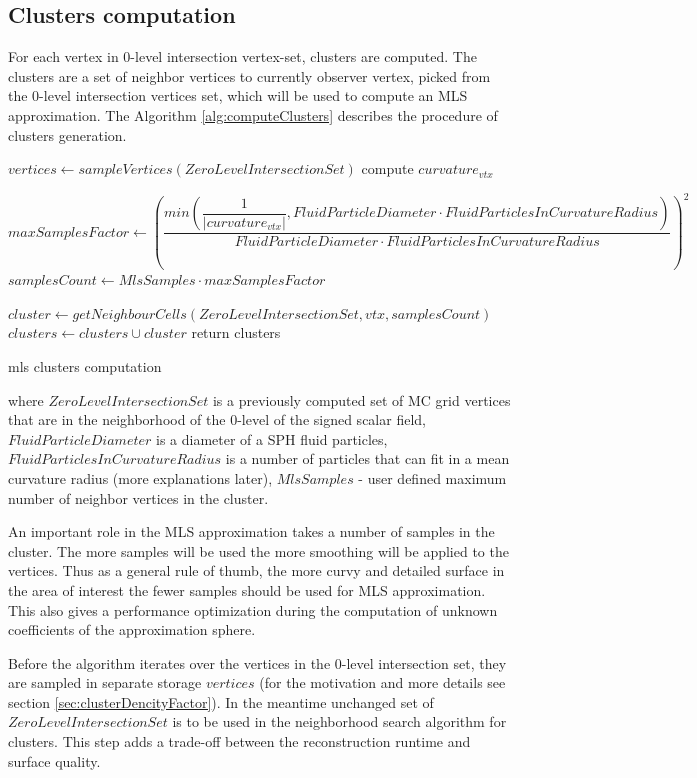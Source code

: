 \subsection{Clusters computation}
For each vertex in  0-level intersection vertex-set, clusters are computed. The clusters are a set of neighbor vertices to currently observer vertex, picked from the 0-level intersection vertices set, which will be used to compute an MLS approximation. The Algorithm \ref{alg:computeClusters} describes the procedure of clusters generation.
\begin{algorithm}[H]
	\scriptsize
	\begin{algorithmic}
			\State $vertices \gets sampleVertices(ZeroLevelIntersectionSet)$
				\State compute $curvature_{vtx}$

				\State $maxSamplesFactor \gets \left(\dfrac{min(\dfrac{1}{|curvature_{vtx}|}, FluidParticleDiameter \cdot FluidParticlesInCurvatureRadius)}{FluidParticleDiameter \cdot FluidParticlesInCurvatureRadius}\right)^2$
				\State $samplesCount \gets MlsSamples \cdot maxSamplesFactor$

				\State $cluster \gets getNeighbourCells(ZeroLevelIntersectionSet, vtx, samplesCount)$
				\State $clusters \gets clusters \cup cluster$ 
			\EndFor
			\State return clusters
	\end{algorithmic}
	\caption{mls clusters computation}
	\label{alg:computeClusters}
\end{algorithm}
where $ZeroLevelIntersectionSet$ is a previously computed set of MC grid vertices that are in the neighborhood of the 0-level of the signed scalar field, $FluidParticleDiameter$ is a diameter of a SPH fluid particles, $FluidParticlesInCurvatureRadius$ is a number of particles that can fit in a mean curvature radius (more explanations later), $MlsSamples$ - user defined maximum number of neighbor vertices in the cluster.

An important role in the MLS approximation takes a number of samples in the cluster. The more samples will be used the more smoothing will be applied to the vertices. Thus as a general rule of thumb, the more curvy and detailed surface in the area of interest the fewer samples should be used for MLS approximation. This also gives a performance optimization during the computation of unknown coefficients of the approximation sphere.

Before the algorithm iterates over the vertices in the 0-level intersection set, they are sampled in separate storage $vertices$ (for the motivation and more details see section \ref{sec:clusterDencityFactor}). In the meantime unchanged set of $ZeroLevelIntersectionSet$ is to be used in the neighborhood search algorithm for clusters. This step adds a trade-off between the reconstruction runtime and surface quality.

